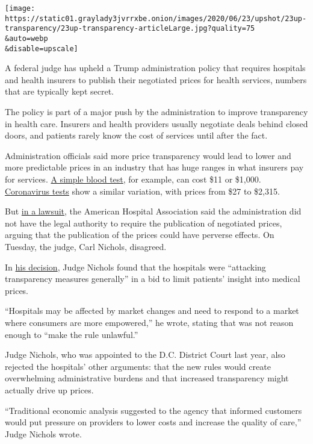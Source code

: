 \texttt{[image: https://static01.graylady3jvrrxbe.onion/images/2020/06/23/upshot/23up-transparency/23up-transparency-articleLarge.jpg?quality=75\\\&auto=webp\\\&disable=upscale]}

A federal judge has upheld a Trump administration policy that requires
hospitals and health insurers to publish their negotiated prices for
health services, numbers that are typically kept secret.

The policy is part of a major push by the administration to improve
transparency in health care. Insurers and health providers usually
negotiate deals behind closed doors, and patients rarely know the cost
of services until after the fact.

Administration officials said more price transparency would lead to
lower and more predictable prices in an industry that has huge ranges in
what insurers pay for services.
\href{https://www.nytimes3xbfgragh.onion/2019/04/30/upshot/health-care-huge-price-discrepancies.html}{A
simple blood test}, for example, can cost \$11 or \$1,000.
\href{https://www.nytimes3xbfgragh.onion/2020/06/16/upshot/coronavirus-test-cost-varies-widely.html}{Coronavirus
tests} show a similar variation, with prices from \$27 to \$2,315.

But
\href{https://www.nytimes3xbfgragh.onion/2019/12/04/health/hospitals-trump-prices-transparency.html}{in
a lawsuit}, the American Hospital Association said the administration
did not have the legal authority to require the publication of
negotiated prices, arguing that the publication of the prices could have
perverse effects. On Tuesday, the judge, Carl Nichols, disagreed.

In
\href{https://ecf.dcd.uscourts.gov/cgi-bin/show_public_doc?2019cv3619-35}{his
decision}, Judge Nichols found that the hospitals were ``attacking
transparency measures generally'' in a bid to limit patients' insight
into medical prices.

``Hospitals may be affected by market changes and need to respond to a
market where consumers are more empowered,'' he wrote, stating that was
not reason enough to ``make the rule unlawful.''

Judge Nichols, who was appointed to the D.C. District Court last year,
also rejected the hospitals' other arguments: that the new rules would
create overwhelming administrative burdens and that increased
transparency might actually drive up prices.

``Traditional economic analysis suggested to the agency that informed
customers would put pressure on providers to lower costs and increase
the quality of care,'' Judge Nichols wrote.


